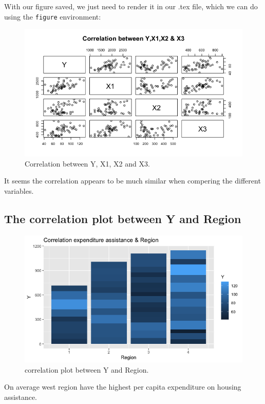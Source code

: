 \documentclass[12pt,letterpaper]{article}
\begin{document}
  
\vspace{.25cm}
\noindent With our figure saved, we just need to render it in our .tex file, which we can do using the \texttt{figure} environment:


\begin{figure}[h!]\centering
	\caption{\footnotesize Correlation between Y, X1, X2 and X3.}
	\label{fig:plot_1}
	\includegraphics[width=.75\textwidth]{Correlation_plot_expenditure.png}
\end{figure}

It seems the correlation appears to be much similar when compering the different variables. 

\subsection*{The correlation plot between Y and Region}


\begin{figure}[h!]\centering
	\caption{\footnotesize correlation plot  between Y and Region.}
	\label{fig:plot_1}
	\includegraphics[width=.75\textwidth]{plot_Y+Region.png}
\end{figure}

On average west region have the highest per capita expenditure on housing assistance. 
\end{document}
